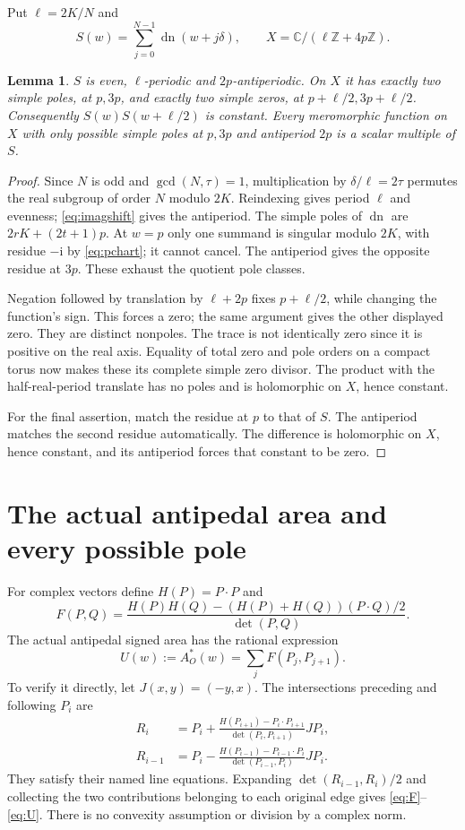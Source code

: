 \documentclass[11pt,letterpaper]{article}
\newtheorem{lemma}[theorem]{Lemma}
\DeclareMathOperator{\dn}{dn}
\newcommand{\ii}{\mathrm i}
\begin{document}
Put $\ell=2K/N$ and
\[
 S(w)=\sum_{j=0}^{N-1}\dn(w+j\delta),\qquad
 X=\mathbb C/(\ell\mathbb Z+4p\mathbb Z).
\]
\begin{lemma}\label{lem:trace}
$S$ is even, $\ell$-periodic and $2p$-antiperiodic. On $X$ it has
exactly two simple poles, at $p,3p$, and exactly two simple zeros, at
$p+\ell/2,3p+\ell/2$. Consequently $S(w)S(w+\ell/2)$ is constant.
Every meromorphic function on $X$ with only possible simple poles at
$p,3p$ and antiperiod $2p$ is a scalar multiple of $S$.
\end{lemma}
\begin{proof}
Since $N$ is odd and $\gcd(N,\tau)=1$, multiplication by
$\delta/\ell=2\tau$ permutes the real subgroup of order $N$ modulo
$2K$. Reindexing gives period $\ell$ and evenness; \eqref{eq:imagshift}
gives the antiperiod. The simple poles of $\dn$ are
$2rK+(2t+1)p$. At $w=p$ only one summand is singular modulo $2K$,
with residue $-\ii$ by \eqref{eq:pchart}; it cannot cancel.
The antiperiod gives the opposite residue at $3p$. These exhaust
the quotient pole classes.

Negation followed by translation by $\ell+2p$ fixes
$p+\ell/2$, while changing the function's sign. This forces a zero;
the same argument gives the other displayed zero. They are distinct
nonpoles. The trace is not identically zero since it is positive on
the real axis. Equality of total zero and pole orders on a compact
torus now makes these its complete simple zero divisor.
The product with the half-real-period translate has no poles and is
holomorphic on $X$, hence constant.

For the final assertion, match the residue at $p$ to that of $S$.
The antiperiod matches the second residue automatically. The
difference is holomorphic on $X$, hence constant, and its antiperiod
forces that constant to be zero.
\end{proof}

\section{The actual antipedal area and every possible pole}
For complex vectors define $H(P)=P\cdot P$ and
\begin{equation}\label{eq:F}
 F(P,Q)=
 \frac{H(P)H(Q)-(H(P)+H(Q))(P\cdot Q)/2}{\det(P,Q)}.
\end{equation}
The actual antipedal signed area has the rational expression
\begin{equation}\label{eq:U}
 U(w):=A_O^*(w)=\sum_jF(P_j,P_{j+1}).
\end{equation}
To verify it directly, let $J(x,y)=(-y,x)$. The intersections
preceding and following $P_i$ are
\[
 \begin{aligned}
 R_i&=P_i+\frac{H(P_{i+1})-P_i\cdot P_{i+1}}
                      {\det(P_i,P_{i+1})}JP_i,\\
 R_{i-1}&=P_i-\frac{H(P_{i-1})-P_{i-1}\cdot P_i}
                      {\det(P_{i-1},P_i)}JP_i.
\end{aligned}
\]
They satisfy their named line equations. Expanding
$\det(R_{i-1},R_i)/2$ and collecting the two contributions belonging
to each original edge gives \eqref{eq:F}--\eqref{eq:U}.
There is no convexity assumption or division by a complex norm.
\end{document}

